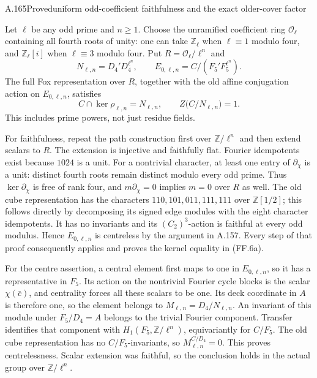 \begin{statement}{A.165}{Proved}{uniform odd-coefficient faithfulness and the exact older-cover factor}
\end{statement}
Let $\ell$ be any odd prime and $n\geq1$. Choose the unramified
coefficient ring $\mathcal O_\ell$ containing all fourth roots
of unity: one can take $\mathbb Z_\ell$ when $\ell\equiv1$
modulo four, and $\mathbb Z_\ell[i]$ when $\ell\equiv3$
modulo four. Put $R=\mathcal O_\ell/\ell^n$ and
\[
 N_{\ell,n}=D_4'D_4^{\ell^n},\qquad
 E_{0,\ell,n}=C/(F_5'F_5^{\ell^n}).
\]
The full Fox representation over $R$, together with the old
affine conjugation action on $E_{0,\ell,n}$, satisfies
\[
 C\cap\ker\rho_{\ell,n}=N_{\ell,n},\qquad
 Z\bigl(C/N_{\ell,n}\bigr)=1.
 \tag{FF.6a}
\]
This includes prime powers, not just residue fields.

For faithfulness, repeat the path construction first over
$\mathbb Z/\ell^n$ and then extend scalars to $R$. The
extension is injective and faithfully flat. Fourier
idempotents exist because $1024$ is a unit. For a nontrivial
character, at least one entry of $\partial_\chi$ is a unit:
distinct fourth roots remain distinct modulo every odd
prime. Thus $\ker\partial_\chi$ is free of rank four,
and $m\partial_\chi=0$ implies $m=0$ over $R$ as well.
The old cube representation has the characters
$110,101,011,111,111$ over $\mathbb Z[1/2]$; this follows
directly by decomposing its signed edge modules with the
eight character idempotents. It has no invariants and its
$(C_2)^3$-action is faithful at every odd modulus. Hence
$E_{0,\ell,n}$ is centreless by the argument in A.157.
Every step of that proof consequently applies and proves
the kernel equality in (FF.6a).

For the centre assertion, a central element first maps to
one in $E_{0,\ell,n}$, so it has a representative in $F_5$.
Its action on the nontrivial Fourier cycle blocks is the
scalar $\chi(\bar c)$, and centrality forces all these
scalars to be one. Its deck coordinate in $A$ is therefore
one, so the element belongs to
$M_{\ell,n}=D_4/N_{\ell,n}$. An invariant of this module
under $F_5/D_4=A$ belongs to the trivial Fourier component.
Transfer identifies that component with
$H_1(F_5,\mathbb Z/\ell^n)$, equivariantly for $C/F_5$.
The old cube representation has no $C/F_5$-invariants,
so $M_{\ell,n}^{C/D_4}=0$. This proves centrelessness.
Scalar extension was faithful, so the conclusion holds in
the actual group over $\mathbb Z/\ell^n$.

